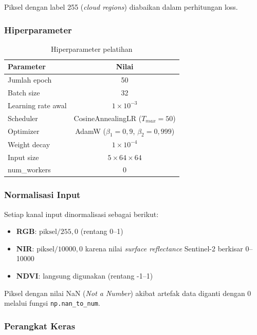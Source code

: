 \documentclass[12pt,a4paper]{article}
\begin{document}
Piksel dengan label 255 (\textit{cloud regions}) diabaikan dalam perhitungan loss.

\subsubsection{Hiperparameter}

\begin{table}[H]
\centering
\caption{Hiperparameter pelatihan}
\label{tab:hyperparams}
\begin{tabular}{lc}
\toprule
\textbf{Parameter} & \textbf{Nilai} \\
\midrule
Jumlah epoch & 50 \\
Batch size & 32 \\
Learning rate awal & $1 \times 10^{-3}$ \\
Scheduler & CosineAnnealingLR ($T_{max}=50$) \\
Optimizer & AdamW ($\beta_1=0,9$, $\beta_2=0,999$) \\
Weight decay & $1 \times 10^{-4}$ \\
Input size & $5 \times 64 \times 64$ \\
num\_workers & 0 \\
\bottomrule
\end{tabular}
\end{table}

\subsubsection{Normalisasi Input}

Setiap kanal input dinormalisasi sebagai berikut:

\begin{itemize}[nosep]
    \item \textbf{RGB}: $\text{piksel} / 255,0$ (rentang 0--1)
    \item \textbf{NIR}: $\text{piksel} / 10000,0$ karena nilai \textit{surface 
          reflectance} Sentinel-2 berkisar 0--10000
    \item \textbf{NDVI}: langsung digunakan (rentang -1--1)
\end{itemize}

Piksel dengan nilai NaN (\textit{Not a Number}) akibat artefak data diganti 
dengan 0 melalui fungsi \texttt{np.nan\_to\_num}.

\subsubsection{Perangkat Keras}
\end{document}
